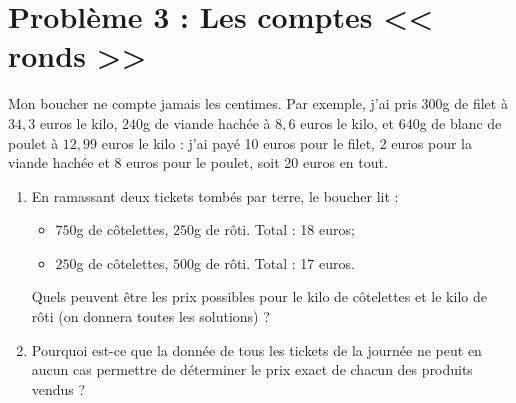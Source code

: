 \documentclass[landscape,twocolumn,leqno,a4paper,10pt]{report} %
\newcommand\n{\noindent}
\begin{document}
\section{Problème 3 : Les comptes << ronds >>}

\n Mon boucher ne compte jamais les centimes. Par exemple, j'ai pris $300$g de filet à $34,3$ euros le kilo, $240$g de viande hachée à $8,6$ euros le kilo, et $640$g de blanc de poulet à $12,99$ euros le kilo : j'ai payé 10 euros pour le filet, 2 euros pour la viande hachée et 8 euros pour le poulet, soit 20 euros en tout.

\begin{enumerate}
	\item En ramassant deux tickets tombés par terre, le boucher lit :
	\begin{itemize}
  		\item $750$g de côtelettes, $250$g de rôti. Total : 18 euros;
		\item $250$g de côtelettes, $500$g de rôti. Total : 17 euros.
	\end{itemize}
	Quels peuvent être les prix possibles pour le kilo de côtelettes et le kilo de rôti (on donnera toutes les solutions) ?
	\item Pourquoi est-ce que la donnée de tous les tickets de la journée ne peut en aucun cas permettre de déterminer le prix exact de chacun des produits vendus ?
\end{enumerate}
\end{document}
